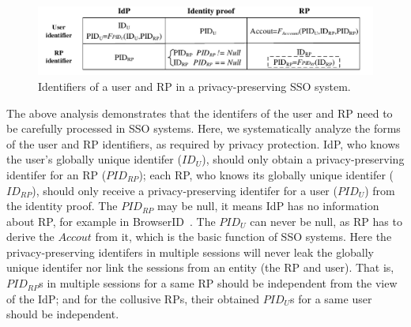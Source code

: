 
\begin{figure}
  \centering
  \includegraphics[width=\linewidth]{fig/IDCorrelation.pdf}
  \caption{Identifiers of a user and RP in a privacy-preserving SSO system.}
  \label{fig:IDCorrelation}
\end{figure}

The above analysis demonstrates that the identifers of the user and RP need to be carefully processed in SSO systems.
Here, we systematically analyze the forms of the user and RP identifiers, as required by privacy protection.
IdP, who knows the user's globally unique identifer ($ID_U$), should only obtain a privacy-preserving identifer for an RP ($PID_{RP}$);
 each RP, who knows its globally unique identifer ($ID_{RP}$), should only receive a privacy-preserving identifer for a user ($PID_{U}$) from the identity proof.
The $PID_{RP}$ may be null, it means IdP has no information about RP, for example in BrowserID~\cite{BrowserID}.
The $PID_{U}$ can never be null, as RP has to derive the $Accout$ from it, which is the basic function of SSO systems.
Here the  privacy-preserving identifers in multiple sessions will never leak the globally unique identifer nor link the sessions from an entity (the RP and user).
That is, $PID_{RP}$s in multiple sessions for a same RP  should be independent from the view of the IdP;
 and for the collusive RPs, their obtained $PID_{U}$s for a same user should be independent.

